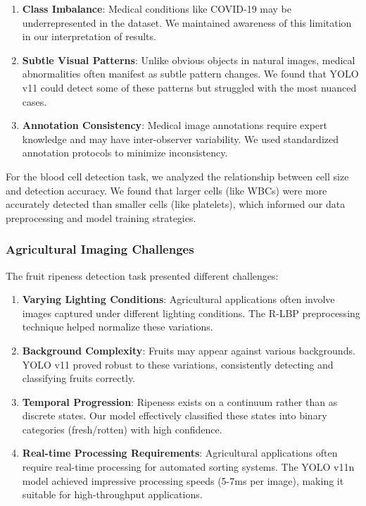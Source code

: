 \begin{multicols}{2}
\begin{enumerate}
    \item \textbf{Class Imbalance}: Medical conditions like COVID-19 may be underrepresented in the dataset. We maintained awareness of this limitation in our interpretation of results.
    
    \item \textbf{Subtle Visual Patterns}: Unlike obvious objects in natural images, medical abnormalities often manifest as subtle pattern changes. We found that YOLO v11 could detect some of these patterns but struggled with the most nuanced cases.
    
    \item \textbf{Annotation Consistency}: Medical image annotations require expert knowledge and may have inter-observer variability. We used standardized annotation protocols to minimize inconsistency.
\end{enumerate}

For the blood cell detection task, we analyzed the relationship between cell size and detection accuracy. We found that larger cells (like WBCs) were more accurately detected than smaller cells (like platelets), which informed our data preprocessing and model training strategies.

\subsubsection{Agricultural Imaging Challenges}

The fruit ripeness detection task presented different challenges:

\begin{enumerate}
    \item \textbf{Varying Lighting Conditions}: Agricultural applications often involve images captured under different lighting conditions. The R-LBP preprocessing technique helped normalize these variations.
    
    \item \textbf{Background Complexity}: Fruits may appear against various backgrounds. YOLO v11 proved robust to these variations, consistently detecting and classifying fruits correctly.
    
    \item \textbf{Temporal Progression}: Ripeness exists on a continuum rather than as discrete states. Our model effectively classified these states into binary categories (fresh/rotten) with high confidence.
    
    \item \textbf{Real-time Processing Requirements}: Agricultural applications often require real-time processing for automated sorting systems. The YOLO v11n model achieved impressive processing speeds (5-7ms per image), making it suitable for high-throughput applications.
\end{enumerate}


\end{multicols}

